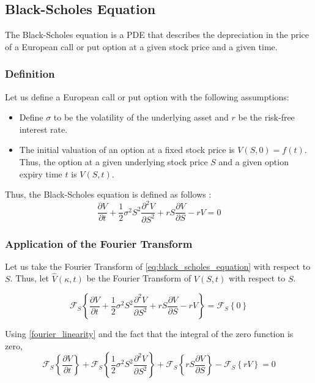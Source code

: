 \subsection{Black-Scholes Equation}
The Black-Scholes equation is a PDE that describes the depreciation in the price of a European call or put option at a given stock price and a given time.

\subsubsection{Definition}
\noindent
Let us define a European call or put option with the following assumptions:
\begin{itemize}
    \item Define \(\sigma\) to be the volatility of the underlying asset and \(r\) be the risk-free interest rate.
    \item The initial valuation of an option at a fixed stock price is  \(V(S,0) = f(t)\). Thus, the option at a given underlying stock price \(S\) and a given option expiry time \(t\) is \(V(S,t)\).
\end{itemize}

\noindent
Thus, the Black-Scholes equation is defined as follows \citep{Buchanan_black_scholes_2014}:
\begin{equation} \label{eq:black_scholes_equation}
    \frac{\partial V}{\partial t} + \frac{1}{2}\sigma^2 S^2 \frac{\partial^2 V}{\partial S^2} + rS\frac{\partial V}{\partial S} - rV = 0
\end{equation}

\subsubsection{Application of the Fourier Transform}
Let us take the Fourier Transform of \cref{eq:black_scholes_equation} with respect to \(S\). Thus, let \(\hat{V}(\kappa, t)\) be the Fourier Transform of \(V(S, t)\) with respect to \(S\).

\begin{equation}
    \mathcal{F}_S \left\{ \frac{\partial V}{\partial t} + \frac{1}{2}\sigma^2 S^2 \frac{\partial^2 V}{\partial S^2} + rS\frac{\partial V}{\partial S} -  rV \right\} = \mathcal{F}_S \left\{ 0 \right\}
\end{equation}

\noindent
Using \cref{fourier_linearity} and the fact that the integral of the zero function is zero,
\begin{equation}
    \mathcal{F}_S \left\{ \frac{\partial V}{\partial t} \right\} + \mathcal{F}_S \left\{ \frac{1}{2}\sigma^2 S^2 \frac{\partial^2 V}{\partial S^2} \right\} + \mathcal{F}_S \left\{ rS\frac{\partial V}{\partial S} \right\} - \mathcal{F}_S \left\{ rV \right\} = 0
\end{equation}

